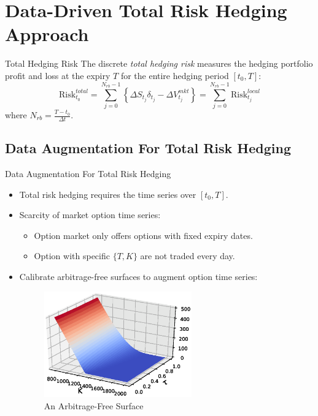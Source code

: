\documentclass[10pt,table,mathserif]{beamer}
\newcommand{\Vmkt}{V^{mkt}}
\newcommand{\Smkt}{S}
\begin{document}
\section{Data-Driven Total Risk Hedging Approach}
\begin{frame}{Total Hedging Risk}
 The  discrete {\em total hedging risk} measures the hedging portfolio profit and loss at the expiry $T$ for the entire hedging period $[t_0, T]$:
\[
    \text{Risk}^{total}_{t_0}=\sum_{j=0}^{N_{rb}-1}\left\{ \Delta \Smkt_{t_j} \delta_{t_j} -\Delta \Vmkt_{t_j} \right\}=\sum_{j=0}^{N_{rb}-1}\text{Risk}^{local}_{t_j}
\]
where $N_{rb}=\frac{T-t_0}{\Delta t}$.
\end{frame}

\subsection{Data Augmentation For Total Risk Hedging}
\begin{frame}{Data Augmentation For Total Risk Hedging}
\begin{itemize}
\item Total risk hedging requires the time series over  $[t_0, T]$.
\item Scarcity of market option time series: 
\begin{itemize}
\item Option market only offers options with fixed expiry dates.  
\item Option with specific $\{T,K\}$ are not traded every day.
\end{itemize}
\item Calibrate arbitrage-free surfaces to augment option time series:
\begin{figure}[htp!]
	\centering
		\includegraphics[width=0.60\textwidth]{../../figures/Price}
\caption{An Arbitrage-Free Surface}
\end{figure}
\end{itemize}


\end{frame}
\end{document}
